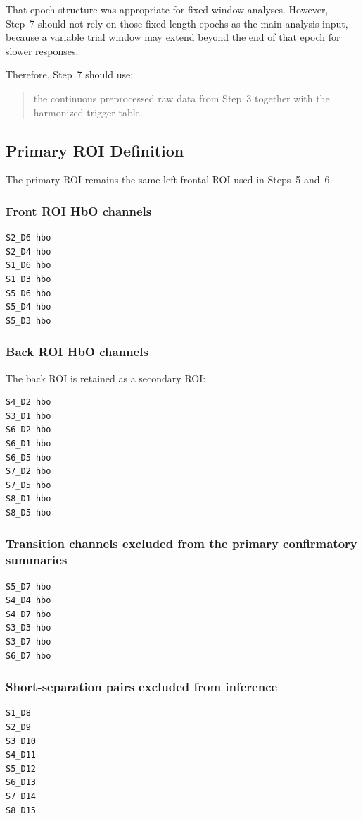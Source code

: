 \documentclass[11pt]{article}
\begin{document}
That epoch structure was appropriate for fixed-window analyses.
However, Step~7 should not rely on those fixed-length epochs as the main analysis input,
because a variable trial window may extend beyond the end of that epoch for slower responses.

Therefore, Step~7 should use:
\begin{quote}
the continuous preprocessed raw data from Step~3 together with the harmonized trigger table.
\end{quote}

\subsection{Primary ROI Definition}
The primary ROI remains the same left frontal ROI used in Steps~5 and~6.

\subsubsection{Front ROI HbO channels}
\begin{verbatim}
S2_D6 hbo
S2_D4 hbo
S1_D6 hbo
S1_D3 hbo
S5_D6 hbo
S5_D4 hbo
S5_D3 hbo
\end{verbatim}

\subsubsection{Back ROI HbO channels}
The back ROI is retained as a secondary ROI:
\begin{verbatim}
S4_D2 hbo
S3_D1 hbo
S6_D2 hbo
S6_D1 hbo
S6_D5 hbo
S7_D2 hbo
S7_D5 hbo
S8_D1 hbo
S8_D5 hbo
\end{verbatim}

\subsubsection{Transition channels excluded from the primary confirmatory summaries}
\begin{verbatim}
S5_D7 hbo
S4_D4 hbo
S4_D7 hbo
S3_D3 hbo
S3_D7 hbo
S6_D7 hbo
\end{verbatim}

\subsubsection{Short-separation pairs excluded from inference}
\begin{verbatim}
S1_D8
S2_D9
S3_D10
S4_D11
S5_D12
S6_D13
S7_D14
S8_D15
\end{verbatim}
\end{document}

